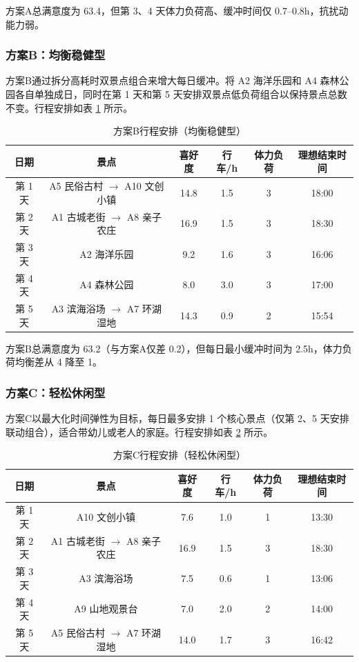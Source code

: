 方案A总满意度为 63.4，但第 3、4 天体力负荷高、缓冲时间仅 0.7--0.8h，抗扰动能力弱。

\subsubsection{方案B：均衡稳健型}

方案B通过拆分高耗时双景点组合来增大每日缓冲。将 A2 海洋乐园和 A4 森林公园各自单独成日，同时在第 1 天和第 5 天安排双景点低负荷组合以保持景点总数不变。行程安排如表 \ref{tab:planB} 所示。

\begin{table}[H]
\centering
\caption{方案B行程安排（均衡稳健型）}
\label{tab:planB}
\begin{tabular}{cccccc}
\toprule
日期 & 景点 & 喜好度 & 行车/h & 体力负荷 & 理想结束时间 \\
\midrule
第 1 天 & A5 民俗古村 $\rightarrow$ A10 文创小镇 & 14.8 & 1.5 & 3 & 18:00 \\
第 2 天 & A1 古城老街 $\rightarrow$ A8 亲子农庄 & 16.9 & 1.5 & 3 & 18:30 \\
第 3 天 & A2 海洋乐园 & 9.2 & 1.6 & 3 & 16:06 \\
第 4 天 & A4 森林公园 & 8.0 & 3.0 & 3 & 17:00 \\
第 5 天 & A3 滨海浴场 $\rightarrow$ A7 环湖湿地 & 14.3 & 0.9 & 2 & 15:54 \\
\bottomrule
\end{tabular}
\end{table}

方案B总满意度为 63.2（与方案A仅差 0.2），但每日最小缓冲时间为 2.5h，体力负荷均衡差从 4 降至 1。

\subsubsection{方案C：轻松休闲型}

方案C以最大化时间弹性为目标，每日最多安排 1 个核心景点（仅第 2、5 天安排联动组合），适合带幼儿或老人的家庭。行程安排如表 \ref{tab:planC} 所示。

\begin{table}[H]
\centering
\caption{方案C行程安排（轻松休闲型）}
\label{tab:planC}
\begin{tabular}{cccccc}
\toprule
日期 & 景点 & 喜好度 & 行车/h & 体力负荷 & 理想结束时间 \\
\midrule
第 1 天 & A10 文创小镇 & 7.6 & 1.0 & 1 & 13:30 \\
第 2 天 & A1 古城老街 $\rightarrow$ A8 亲子农庄 & 16.9 & 1.5 & 3 & 18:30 \\
第 3 天 & A3 滨海浴场 & 7.5 & 0.6 & 1 & 13:06 \\
第 4 天 & A9 山地观景台 & 7.0 & 2.0 & 2 & 14:00 \\
第 5 天 & A5 民俗古村 $\rightarrow$ A7 环湖湿地 & 14.0 & 1.7 & 3 & 16:42 \\
\bottomrule
\end{tabular}
\end{table}

